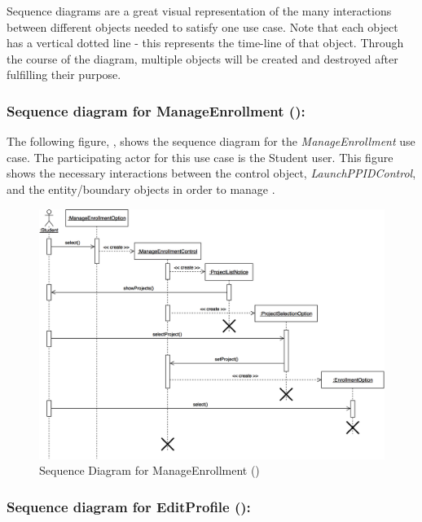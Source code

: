 \documentclass[12pt,letterpaper]{article}
\begin{document}
Sequence diagrams are a great visual representation of the many interactions between different objects needed to satisfy one use case. Note that
each object has a vertical dotted line - this represents the time-line of that object. Through the course of the diagram, multiple objects will be created
and destroyed after fulfilling their purpose.

\newpage{}

\subsubsection*{Sequence diagram for ManageEnrollment ():}

The following figure, , shows the sequence diagram for the {\it ManageEnrollment} use case. The participating actor for this use case
is the Student user. This figure shows the necessary interactions between the control object, {\it LaunchPPIDControl}, and the entity/boundary objects
in order to manage .
\begin{figure}[H]
	\centering{}
	\includegraphics[scale=0.27]{imgs/seq/manage-enrollment.png}
	\caption[ - Sequence Diagram for ManageEnrollment]{Sequence Diagram for ManageEnrollment ()}
\end{figure}

\newpage{}

\subsubsection*{Sequence diagram for EditProfile ():}
\end{document}

